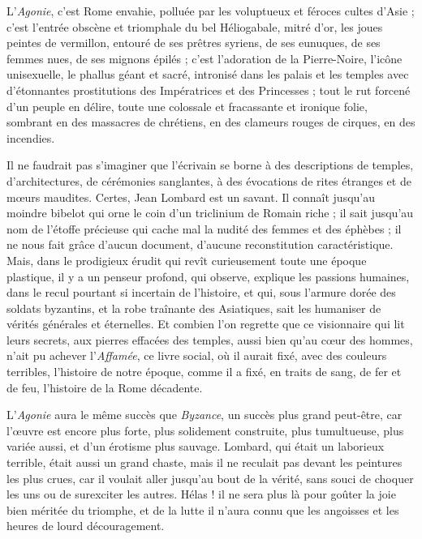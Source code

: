 \documentclass[a4paper, 11pt, oneside, polutonikogreek, french]{article}
\begin{document}
L'\emph{Agonie}, c'est Rome envahie, polluée par les voluptueux et féroces cultes d'Asie ; c'est l'entrée obscène et triomphale du bel Héliogabale, mitré d'or, les joues peintes de vermillon, entouré de ses prêtres syriens, de ses eunuques, de ses femmes nues, de ses mignons épilés ; c'est l'adoration de la Pierre-Noire, l'icône unisexuelle, le phallus géant et sacré, intronisé dans les palais et les temples avec d'étonnantes prostitutions des Impératrices et des Princesses ; tout le rut forcené d'un peuple en délire, toute une colossale et fracassante et ironique folie, sombrant en des massacres de chrétiens, en des clameurs rouges de cirques, en des incendies.

Il ne faudrait pas s'imaginer que l'écrivain se borne à des descriptions de temples, d'architectures, de cérémonies sanglantes, à des évocations de rites étranges et de mœurs maudites. Certes, Jean Lombard est un savant. Il connaît jusqu'au moindre bibelot qui orne le coin d'un triclinium de Romain riche ; il sait jusqu'au nom de l'étoffe précieuse qui cache mal la nudité des femmes et des éphèbes ; il ne nous fait grâce d'aucun document, d'aucune reconstitution caractéristique. Mais, dans le prodigieux érudit qui revît curieusement toute une époque plastique, il y a un penseur profond, qui observe, explique les passions humaines, dans le recul pourtant si incertain de l'histoire, et qui, sous l'armure dorée des soldats byzantins, et la robe traînante des Asiatiques, sait les humaniser de vérités générales et éternelles. Et combien l'on regrette que ce visionnaire qui lit leurs secrets, aux pierres effacées des temples, aussi bien qu'au cœur des hommes, n'ait pu achever l'\emph{Affamée}, ce livre social, où il aurait fixé, avec des couleurs terribles, l'histoire de notre époque, comme il a fixé, en traits de sang, de fer et de feu, l'histoire de la Rome décadente.

L'\emph{Agonie} aura le même succès que \emph{Byzance}, un succès plus grand peut-être, car l'œuvre est encore plus forte, plus solidement construite, plus tumultueuse, plus variée aussi, et d'un érotisme plus sauvage. Lombard, qui était un laborieux terrible, était aussi un grand chaste, mais il ne reculait pas devant les peintures les plus crues, car il voulait aller jusqu'au bout de la vérité, sans souci de choquer les uns ou de surexciter les autres. Hélas ! il ne sera plus là pour goûter la joie bien méritée du triomphe, et de la lutte il n'aura connu que les angoisses et les heures de lourd découragement.
\end{document}
